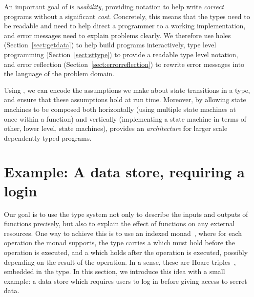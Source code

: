 An important goal of \states{} is \emph{usability}, providing notation
to help write \emph{correct} programs without a significant \emph{cost}.
Concretely, this means
that the types need to be readable and need to help direct a programmer to a
working implementation, and error messages need to explain problems clearly. 
We therefore use holes (Section~\ref{sect:getdata})
to help build programs interactively, type level programming
(Section~\ref{sect:sttype}) to provide a readable type level notation, and
error reflection (Section~\ref{sect:errorreflection}) to rewrite error messages
into the language of the problem domain.

Using \states{}, we can encode the assumptions we make about state transitions
in a type, and ensure that these assumptions hold at
run time. Moreover, by allowing state machines to be composed both horizontally
(using multiple state machines at once within a function) and vertically
(implementing a state machine in terms of other, lower level, state machines),
\states{} provides an \emph{architecture} for larger scale dependently typed
programs.




\section{Example: A data store, requiring a login}

Our goal is to use the type system not only to describe the inputs
and outputs of functions precisely, but also to explain the effect of
functions on any external resources. 
One way to achieve this is to use an indexed monad~\citep{atkey-param},
where for each operation the monad supports, the type carries a
 which must hold before the operation is executed,
and a  which holds after the operation is executed,
possibly depending on the result of the operation. In a sense, these
are Hoare triples~\citep{hoarelogic}, embedded in the type.
%
In this section, we introduce this idea with a small example: a data store which requires users
to log in before giving access to secret data. 

